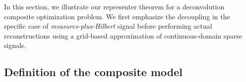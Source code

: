 \documentclass[12pt]{article}
\begin{document}
    In this section, we illustrate our representer theorem for a deconvolution composite optimization problem. We first emphasize the decoupling in the specific case of \emph{measures-plus-Hilbert} signal before performing actual reconstructions using a grid-based approximation of continuous-domain sparse signals.


    \subsection{Definition of the composite model}
    \label{sec:comp:model}

        
\end{document}
